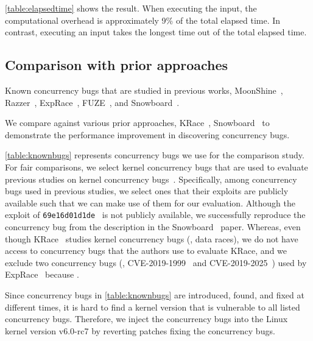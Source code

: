 \autoref{table:elapsedtime} shows the result. When executing the
input, the computational overhead is approximately 9\% of the total
elapsed time. In contrast, executing an input takes the longest time
out of the total elapsed time.
\dr{}



\subsection{Comparison with prior approaches}
\label{ss:comparison}

\begin{table}[t]
  
  \centering
  \caption{Known concurrency bugs that are studied in previous works,
    MoonShine~\cite{moonshine}, Razzer~\cite{razzer},
    ExpRace~\cite{exprace}, FUZE~\cite{fuze}, and
    Snowboard~\cite{snowboard}.}
  \label{table:knownbugs}
\end{table}

We compare \sys against various prior approaches, KRace~\cite{krace},
Snowboard~\cite{snowboard} to demonstrate the performance improvement
in discovering concurrency bugs.

%
\autoref{table:knownbugs} represents concurrency bugs we use for the
comparison study.
%
For fair comparisons, we select kernel concurrency bugs that are used
to evaluate previous studies on kernel concurrency bugs~\cite{exprace,
  razzer, snowboard, moonshine, fuze}.
%
Specifically, among concurrency bugs used in previous studies, we
select ones that their exploits are publicly available such that we
can make use of them for our evaluation.
%
Although the exploit of \texttt{69e16d01d1de}~\cite{snowboardbug} is
not publicly available, we successfully reproduce the concurrency bug
from the description in the Snowboard~\cite{snowboard} paper.
%
Whereas, even though KRace~\cite{krace} studies kernel concurrency
bugs (\ie, data races), we do not have access to concurrency bugs that
the authors use to evaluate KRace, and we exclude two concurrency bugs
(\ie, CVE-2019-1999~\cite{cve20191999} and
CVE-2019-2025~\cite{cve20192025}) used by ExpRace~\cite{exprace}
because .



%
Since concurrency bugs in \autoref{table:knownbugs} are introduced,
found, and fixed at different times, it is hard to find a kernel
version that is vulnerable to all listed concurrency bugs.
%
Therefore, we inject the concurrency bugs into the Linux kernel
version v6.0-rc7 by reverting patches fixing the concurrency bugs.




